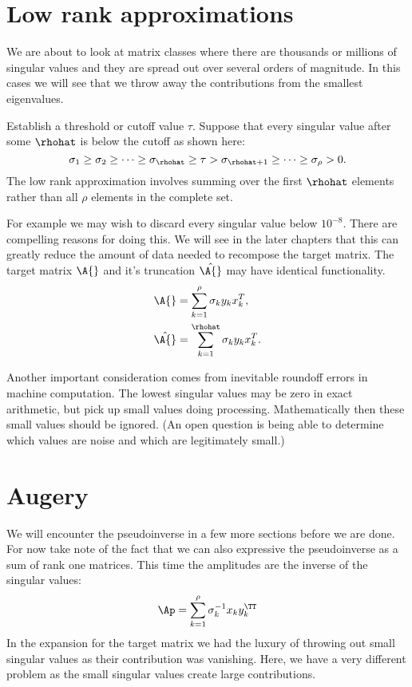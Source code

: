 \section{Low rank approximations}
We are about to look at matrix classes where there are thousands or millions of singular values and they are spread out over several orders of magnitude. In this cases we will see that we throw away the contributions from the smallest eigenvalues.

Establish a threshold or cutoff value $\tau$. Suppose that every singular value after some $\rhohat$ is below the cutoff as shown here:
\begin{equation}
  \sigma_{1} \ge \sigma_{2} \ge \dots \ge \sigma_{\rhohat} \ge \tau > \sigma_{\rhohat+1} \ge \dots \ge \sigma_{\rho} > 0.
\end{equation}
The low rank approximation involves summing over the first $\rhohat$ elements rather than all $\rho$ elements in the complete set.

For example we may wish to discard every singular value below $10^{-8}$. There are compelling reasons for doing this. We will see in the later chapters that this can greatly reduce the amount of data needed to recompose the target matrix. The target matrix $\A{}$ and it's truncation $\hat{\A{}}$ may have identical functionality.
\begin{equation}
  \begin{split}
    \A{}       & = \sum_{k=1}^{\rho}  \sigma_{k} y_{k} x_{k}^{T}, \\
    \hat{\A{}} & = \sum_{k=1}^{\rhohat} \sigma_{k} y_{k} x_{k}^{T}.
  \end{split}
\end{equation}


Another important consideration comes from inevitable roundoff errors in machine computation. The lowest singular values may be zero in exact arithmetic, but pick up small values doing processing. Mathematically then these small values should be ignored. (An open question is being able to determine which values are noise and which are legitimately small.)

\section{Augery}
We will encounter the pseudoinverse in a few more sections before we are done. For now take note of the fact that we can also expressive the pseudoinverse as a sum of rank one matrices. This time the amplitudes are the inverse of the singular values:
\begin{equation}
  \Ap = \sum_{k=1}^{\rho}{ \sigma_{k}^{-1} x_{k} y_{k}^{\TT} }
\end{equation}
In the expansion for the target matrix we had the luxury of throwing out small singular values as their contribution was vanishing. Here, we have a very different problem as the small singular values create large contributions.


\endinput